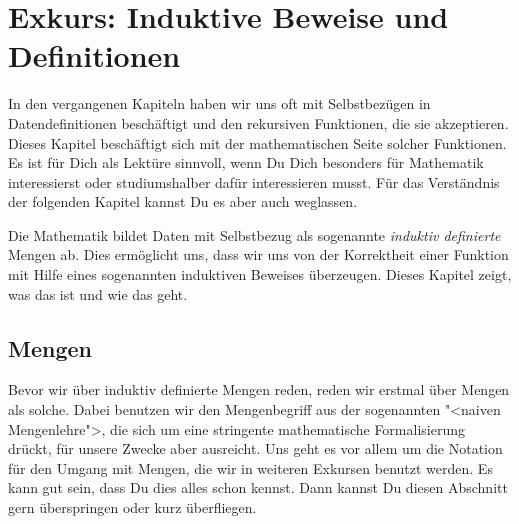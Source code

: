 
\chapter{Exkurs: Induktive Beweise und Definitionen}
\label{cha:indu}

In den vergangenen Kapiteln haben wir uns oft mit Selbstbezügen in
Datendefinitionen beschäftigt und den rekursiven Funktionen, die sie
akzeptieren.  Dieses Kapitel beschäftigt sich mit der mathematischen
Seite solcher Funktionen.  Es ist für Dich als Lektüre sinnvoll, wenn
Du Dich besonders für Mathematik interessierst oder studiumshalber
dafür interessieren musst.  Für das Verständnis der folgenden Kapitel
kannst Du es aber auch weglassen.

Die Mathematik bildet Daten mit Selbstbezug als sogenannte
\textit{induktiv definierte} Mengen ab.  Dies ermöglicht uns, dass wir
uns von der Korrektheit einer Funktion mit Hilfe eines sogenannten
induktiven Beweises überzeugen.  Dieses Kapitel zeigt, was das ist und
wie das geht.

\section{Mengen}
\label{sec:mengen}

Bevor wir über induktiv definierte Mengen reden, reden wir erstmal
über Mengen als solche.  Dabei benutzen wir den
Mengenbegriff aus der sogenannten "<naiven Mengenlehre">, die sich um
eine stringente mathematische Formalisierung drückt, für unsere Zwecke
aber ausreicht.  Uns geht es vor allem um die Notation für den Umgang
mit Mengen, die wir in weiteren Exkursen benutzt werden.  Es kann gut
sein, dass Du dies alles schon kennst.  Dann kannst Du diesen
Abschnitt gern überspringen oder kurz überfliegen.

